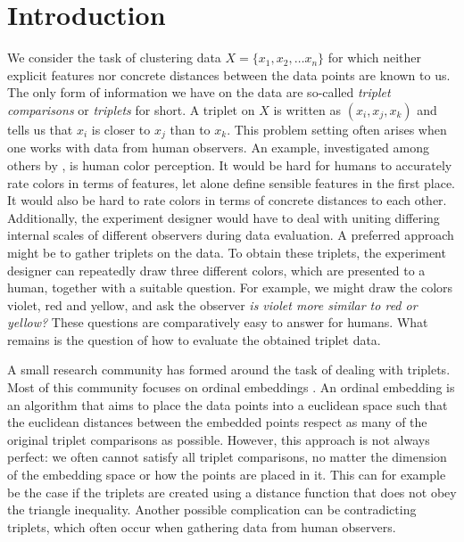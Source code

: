 \chapter{Introduction}\label{Introduction}
We consider the task of clustering data $X = \{x_1, x_2, \ldots x_n \}$ for which neither 
explicit features nor concrete distances between the data points are known to us. 
The only form of information we have on the data are so-called 
\textit{triplet comparisons} or \textit{triplets} for short. A triplet 
on $X$ is written as $(x_i, x_j, x_k)$ and tells us that $x_i$ is closer to $x_j$ than to $x_k$. 
This problem setting often arises when one works with data from human observers. 
An example, investigated among others by \citep{shepardAnalysisProximitiesMultidimensional1962}, 
is human color perception. It would be hard for humans to accurately rate colors in 
terms of features, let alone define sensible features in the first place.  It would also be hard to rate colors in terms of concrete distances to each other.
Additionally, the experiment designer would have to deal with uniting differing internal scales of different observers during data evaluation. 
A preferred approach might be to gather triplets on the data. 
To obtain these triplets, the experiment designer can repeatedly draw
three different colors, which are presented to a human, together with a 
suitable question. For example, we might draw the colors violet, red and yellow,
and ask the observer \textit{is violet more similar to red or yellow?} These questions
are comparatively easy to answer for humans. 
What remains is the question of how to evaluate the obtained triplet data.

A small research community has formed around the task of dealing with triplets.
Most of this community focuses on ordinal embeddings
\citep{agarwalGeneralizedNonmetricMultidimensional2007, tamuzAdaptivelyLearningCrowd2011,
laurensvandermaatenStochasticTripletEmbedding2012,   teradaLocalOrdinalEmbedding2014, jainFiniteSamplePrediction2016, ghoshLandmarkOrdinalEmbedding2019, andertonScalingOrdinalEmbedding2019}.
An ordinal embedding is an algorithm that aims to place the data points into a euclidean space
such that the euclidean distances between the embedded points respect as many of the original triplet comparisons as possible. 
However, this approach is not always perfect: we often cannot satisfy all triplet comparisons, 
no matter the dimension of the embedding space or how the points are placed in it. 
This can for example be the case if the triplets are created using a distance function that does not obey the triangle inequality. Another possible complication can be contradicting triplets,
which often occur when gathering data from human observers. 

